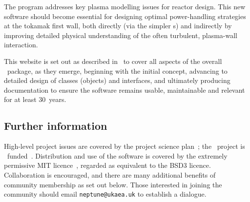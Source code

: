 
The program addresses key plasma modelling issues for reactor design.
This new software should become essential for designing optimal 
power-handling strategies at the tokamak first wall, both directly (via the 
simpler \papp s) and indirectly by improving detailed physical understanding of the 
often turbulent,  plasma-wall interaction.

This website is set out as described in~\cite{y2d34} 
to cover all aspects of the overall \nep \ package, as they emerge,
beginning with the initial concept, advancing to detailed design
of classes (objects) and  interfaces, and ultimately producing documentation
to ensure the software remains usable, maintainable and relevant for at least 30~years.


\subsection{Further information}
High-level project issues are covered by the project science plan~\cite{sciplan};
the \nep \ project is \exc \ funded~\cite{exch+eswebsite}. 
Distribution and use of the software is covered by the extremely
permissive MIT licence~\cite{MITlicense}, regarded as equivalent to the BSD3 licence.
Collaboration is encouraged, and there are many additional benefits of community membership
as set out below. Those interested in joining the community should
 email {\tt neptune@ukaea.uk} to establish a dialogue.


